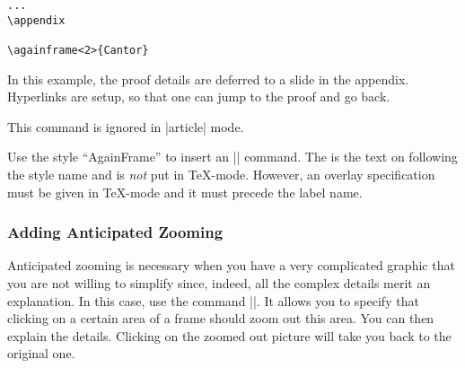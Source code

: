 \begin{command}{\againframe{}}
\begin{verbatim}
...
\appendix

\againframe<2>{Cantor}
\end{verbatim}
  In this example, the proof details are deferred to a slide in the
  appendix. Hyperlinks are setup, so that one can jump to the proof
  and go back.

  \articlenote
  This command is ignored in |article| mode.

  \lyxnote
  Use the style ``AgainFrame'' to insert an |\againframe| command. The
   is the text on following the style name
  and is \emph{not} put in \TeX-mode. However, an overlay specification
  must be given in \TeX-mode and it must precede the label name.
\end{command}



\subsubsection{Adding Anticipated Zooming}

\label{section-zooming}


Anticipated zooming is necessary when you have a very complicated
graphic that you are not willing to simplify since, indeed, all the
complex details merit an explanation. In this case, use the command
|\framezoom|. It allows you to specify that clicking on a certain area
of a frame should zoom out this area. You can then explain the
details. Clicking on the zoomed out picture will take you back to the
original one. 

